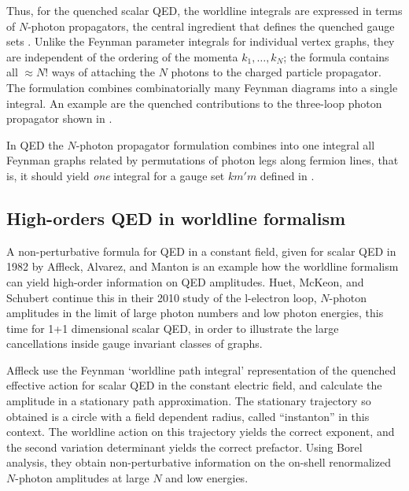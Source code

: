 Thus, for the quenched scalar QED, the worldline integrals are expressed
in terms of $N$-photon propagators, the central ingredient that defines
the quenched gauge sets .
Unlike the Feynman parameter integrals for individual vertex graphs, they are
independent of the ordering of the momenta $k_1,\ldots,k_N$; the formula
 contains all $\approx N!$ ways of attaching the $N$
photons to the charged particle propagator.
The formulation combines combinatorially many Feynman diagrams into a single integral.
An example are the quenched contributions to the
three-loop photon propagator shown in .

In QED the $N$-photon propagator formulation combines into one integral
all Feynman graphs related by permutations of photon legs along fermion
lines, that is, it should yield \emph{one} integral for a gauge set
$km'm$ defined in .

\subsection{High-orders QED in worldline formalism}
\label{sect:highQEDworldline}

A non-perturbative formula for QED in a constant field, given for scalar
QED in 1982 by Affleck, Alvarez, and Manton is an example how the
worldline formalism can yield high-order information on QED amplitudes.
Huet, McKeon, and Schubert continue this in their 2010
study of the l-electron loop, $N$-photon amplitudes in the limit of large
photon numbers and low photon energies, this time for 1+1 dimensional
scalar QED, in order to illustrate the large cancellations inside gauge
invariant classes of graphs.

Affleck \etal{} use the Feynman `worldline
path integral' representation of the quenched effective action for scalar
QED in the constant electric field, and calculate the amplitude in a
stationary path approximation. The stationary trajectory so obtained is a
circle with a field dependent radius, called ``instanton''  in this
context. The worldline action on this trajectory yields the correct
exponent, and the second variation determinant yields the correct  prefactor.
Using Borel analysis, they obtain non-perturbative information on the
on-shell renormalized $N$-photon amplitudes at large $N$ and low energies.

